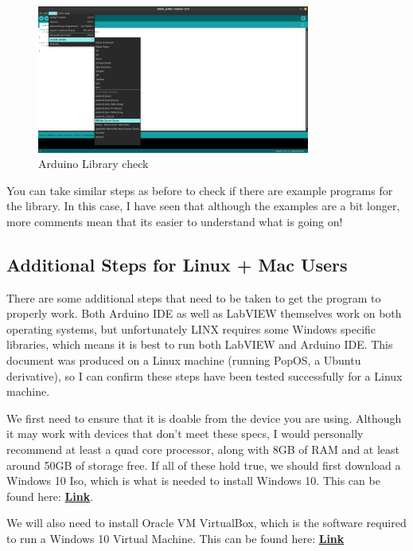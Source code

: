 \documentclass[a4paper,11pt]{report}
\let\oldhref\href %
\renewcommand{\href}[2]{\oldhref{#1}{\bfseries#2}}
\begin{document}
\begin{figure}[H]
\centering
\includegraphics[width=0.8\textwidth]{screenshots/arduinolibraryinstallcheck}
\caption{Arduino Library check}
\end{figure}

You can take similar steps as before to check if there are example programs for the library. In this case, I have seen that although the examples are a bit longer, more comments mean that its easier to understand what is going on!

\subsection{Additional Steps for Linux + Mac Users}

There are some additional steps that need to be taken to get the program to properly work. Both Arduino IDE as well as LabVIEW themselves work on both operating systems, but unfortunately LINX requires some Windows specific libraries, which means it is best to run both LabVIEW and Arduino IDE. This document was produced on a Linux machine (running PopOS, a Ubuntu derivative), so I can confirm these steps have been tested successfully for a Linux machine.

We first need to ensure that it is doable from the device you are using. Although it may work with devices that don't meet these specs, I would personally recommend at least a quad core processor, along with 8GB of RAM and at least around 50GB of storage free. If all of these hold true, we should first download a Windows 10 Iso, which is what is needed to install Windows 10. This can be found here: \href{https://www.microsoft.com/en-gb/software-download/windows10ISO}{Link}.

We will also need to install Oracle VM VirtualBox, which is the software required to run a Windows 10 Virtual Machine. This can be found here: \href{https://www.virtualbox.org/}{Link}
\end{document}
